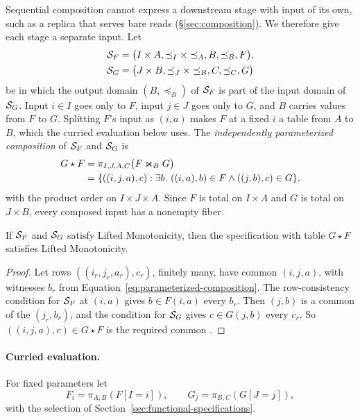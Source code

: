 Sequential composition cannot express a downstream stage with input of its
own, such as a replica that serves bare reads (\S\ref{sec:composition}).  We
therefore give each stage a separate input.  Let
\begin{align*}
  \mathcal{S}_F&=\bigl(I\times A,\preceq_I\times\preceq_A,B,\preceq_B,F\bigr),\\
  \mathcal{S}_G&=\bigl(J\times B,\preceq_J\times\preceq_B,C,\preceq_C,G\bigr)
\end{align*}
be \spectype[s] in which the output domain $(B,\preceq_B)$ of $\mathcal{S}_F$ is
part of the input domain of $\mathcal{S}_G$.  Input $i\in I$ goes only to $F$,
input $j\in J$ goes only to $G$, and $B$ carries values from $F$ to $G$.
Splitting $F$'s input as $(i,a)$ makes $F$ at a fixed $i$ a table from $A$ to
$B$, which the curried evaluation below uses.  The \emph{independently
parameterized composition} of $\mathcal{S}_F$ and $\mathcal{S}_G$ is
\begin{align}
  G\star F
  &=\pi_{I,J,A,C}\bigl(F\Join_{B}G\bigr) \notag\\
  &=\{((i,j,a),c):\exists b.\ ((i,a),b)\in F
                         \land ((j,b),c)\in G\},
  \label{eq:parameterized-composition}
\end{align}
with the product order on $I\times J\times A$.  Since $F$ is total on
$I\times A$ and $G$ is total on $J\times B$, every composed input has a
nonempty fiber.

\begin{lemma}
\label{lem:parameterized-composition}
If $\mathcal{S}_F$ and $\mathcal{S}_G$ satisfy Lifted Monotonicity, then the specification
with table $G\star F$ satisfies Lifted Monotonicity.
\end{lemma}

\begin{proof}
Let rows $((i_r,j_r,a_r),c_r)$, finitely many, have common \indesc $(i,j,a)$,
with witnesses $b_r$ from Equation~\ref{eq:parameterized-composition}.  The
row-consistency condition for $\mathcal{S}_F$ at $(i,a)$ gives $b\in F(i,a)$
\outrelpart every $b_r$.  Then $(j,b)$ is a common \indesc of the
$(j_r,b_r)$, and the condition for $\mathcal{S}_G$ gives $c\in G(j,b)$ \outrelpart
every $c_r$.  So $((i,j,a),c)\in G\star F$ is the required common \outnoun.
\end{proof}

\paragraph{Curried evaluation.}
For fixed parameters let
\begin{equation}
  F_i=\pi_{A,B}(F[I=i]),
  \qquad
  G_j=\pi_{B,C}(G[J=j]),
  \label{eq:curried-fibers}
\end{equation}
with the selection of Section~\ref{sec:functional-specifications}.

